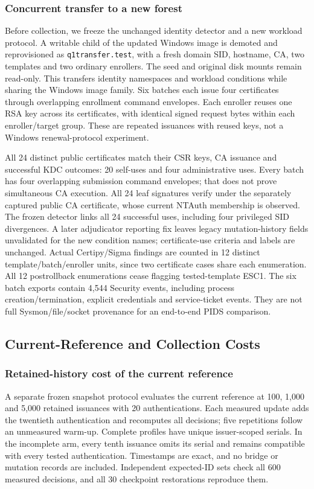 \subsubsection{Concurrent transfer to a new forest}
Before collection, we freeze the unchanged identity detector and a new workload protocol. A writable child of the updated Windows image is demoted and reprovisioned as \texttt{q1transfer.test}, with a fresh domain SID, hostname, CA, two templates and two ordinary enrollers. The seed and original disk mounts remain read-only. This transfers identity namespaces and workload conditions while sharing the Windows image family. Six batches each issue four certificates through overlapping enrollment command envelopes. Each enroller reuses one RSA key across its certificates, with identical signed request bytes within each enroller/target group. These are repeated issuances with reused keys, not a Windows renewal-protocol experiment.

All 24 distinct public certificates match their CSR keys, CA issuance and successful KDC outcomes: 20 self-uses and four administrative uses. Every batch has four overlapping submission command envelopes; that does not prove simultaneous CA execution. All 24 leaf signatures verify under the separately captured public CA certificate, whose current NTAuth membership is observed. The frozen detector links all 24 successful uses, including four privileged SID divergences. A later adjudicator reporting fix leaves legacy mutation-history fields unvalidated for the new condition names; certificate-use criteria and labels are unchanged. Actual Certipy/Sigma findings are counted in 12 distinct template/batch/enroller units, since two certificate cases share each enumeration. All 12 postrollback enumerations cease flagging tested-template ESC1. The six batch exports contain 4,544 Security events, including process creation/termination, explicit credentials and service-ticket events. They are not full Sysmon/file/socket provenance for an end-to-end PIDS comparison.

\subsection{Current-Reference and Collection Costs}
\subsubsection{Retained-history cost of the current reference}
A separate frozen snapshot protocol evaluates the current reference at 100, 1,000 and 5,000 retained issuances with 20 authentications. Each measured update adds the twentieth authentication and recomputes all decisions; five repetitions follow an unmeasured warm-up. Complete profiles have unique issuer-scoped serials. In the incomplete arm, every tenth issuance omits its serial and remains compatible with every tested authentication. Timestamps are exact, and no bridge or mutation records are included. Independent expected-ID sets check all 600 measured decisions, and all 30 checkpoint restorations reproduce them.

